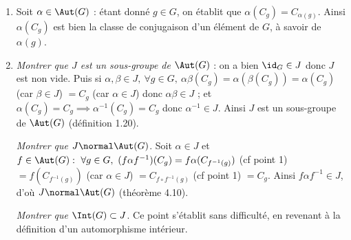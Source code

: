 
\begin{enumerate}
    \item Soit $\alpha\in \Aut(G)$ : étant donné $g\in G$, on établit que $\alpha(C_g)= C_{\alpha(g)}$. Ainsi $\alpha(C_g)$ est bien la classe de conjugaison d'un élément de $G$, à savoir de $\alpha(g)$.
    \item \emph{Montrer que $J$ est un sous-groupe de $\Aut(G)$} : on a bien $\id_{G}\in J$ donc $J$ est non vide. Puis si $\alpha, \beta \in J,~\forall g\in G,~ \alpha \beta(C_g) = \alpha\left(\beta(C_g)\right)=\alpha(C_g)$ (car $\beta \in J$) $=C_g$ (car $\alpha\in J$) donc $\alpha\beta \in J$ ; et $\alpha(C_g)=C_g \implies \alpha^{-1}(C_g) = C_g$ donc $\alpha^{-1}\in J$. Ainsi $J$ est un sous-groupe de $\Aut(G)$ (définition 1.20).

    \emph{Montrer que $J\normal \Aut(G)$}. Soit $\alpha\in J$ et $f\in \Aut(G):~ \forall g\in G,~ (f\alpha f^{-1})(C_g) = f \alpha (C_{f^{-1}(g)})$ (cf point 1) $= f\left(C_{f^{-1}(g)} \right)$ (car $\alpha \in J$) $=C_{f\circ f^{-1}(g)}$ (cf point 1) $ =C_g$. Ainsi $f\alpha f^{-1} \in J$, d'où $J\normal \Aut(G)$ (théorème 4.10).

    \emph{Montrer que $\Int(G) \subset J$}. Ce point s'établit sans difficulté, en revenant à la définition d'un automorphisme intérieur.



\end{enumerate}
